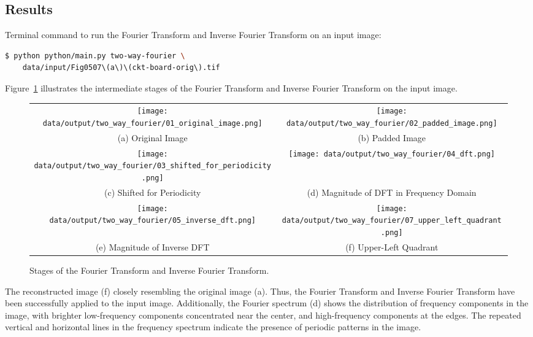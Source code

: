 \documentclass[a4paper,12pt]{article}
\begin{document}
\subsection{Results}

Terminal command to run the Fourier Transform and Inverse Fourier Transform on an input image:

\begin{lstlisting}[language=bash]
$ python python/main.py two-way-fourier \
    data/input/Fig0507\(a\)\(ckt-board-orig\).tif
\end{lstlisting}

Figure~\ref{fig:two-way-fourier} illustrates the intermediate stages of the Fourier Transform and Inverse Fourier Transform on the input image.

\begin{figure}[hbtp]
    \begin{tabular}{cc}
        \texttt{[image: data/output/two\_way\_fourier/01\_original\_image.png]} &
        \texttt{[image: data/output/two\_way\_fourier/02\_padded\_image.png]} \\
        (a) Original Image & (b) Padded Image \\
        \texttt{[image: data/output/two\_way\_fourier/03\_shifted\_for\_periodicity.png]} &
        \texttt{[image: data/output/two\_way\_fourier/04\_dft.png]} \\
        (c) Shifted for Periodicity & (d) Magnitude of DFT in Frequency Domain \\
        \texttt{[image: data/output/two\_way\_fourier/05\_inverse\_dft.png]} &
        \texttt{[image: data/output/two\_way\_fourier/07\_upper\_left\_quadrant.png]} \\
        (e) Magnitude of Inverse DFT & (f) Upper-Left Quadrant \\
    \end{tabular}
    \caption{\label{fig:two-way-fourier} Stages of the Fourier Transform and Inverse Fourier Transform.}
\end{figure}

The reconstructed image (f) closely resembling the original image (a). Thus, the Fourier Transform and Inverse Fourier Transform have been successfully applied to the input image. Additionally, the Fourier spectrum (d) shows the distribution of frequency components in the image, with brighter low-frequency components concentrated near the center, and high-frequency components at the edges. The repeated vertical and horizontal lines in the frequency spectrum indicate the presence of periodic patterns in the image.
\end{document}
